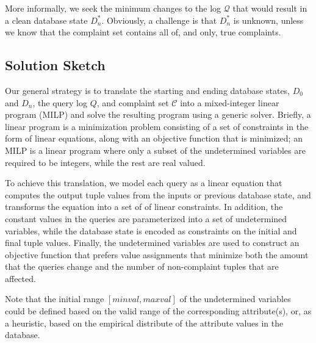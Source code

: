 More informally, we seek the minimum changes to the log $\mathcal{Q}$
that would result in a clean database state $D_n^*$. Obviously, a
challenge is that $D_n^*$ is unknown, unless we know that the
complaint set contains all of, and only, true complaints. 


\subsection{Solution Sketch}

Our general strategy is to translate the starting
and ending database states, $D_0$ and $D_n$, the query log $Q$, and
complaint set $\mathcal{C}$ into a mixed-integer linear program (MILP)
and solve the resulting program using a generic solver.  
Briefly, a linear program is a minimization problem consisting of
a set of constraints in the form of linear equations, along with
an objective function that is minimized; an MILP is a linear program
where only a subset of the undetermined variables are required to
be integers, while the rest are real valued.  

\iffalse
For example, in the following
example, $b$ and $z$ are undetermined integer and real valued variables, respectively,
whereas $x$ is determined to be $1$.  The objective function is $b+z$, 
resulting in the optimal solution $b = z = 1$.

\[
\begin{array}{l l l}
minimize      & b + z\\
\mbox{s.t.}   &x &= b * z \\
              &x &= 1\\
              &b &\in \{0, 1, 2, 3\}\\
              &z &\le 6\\
              &z &\ge 0\\
\end{array}
\]
\fi

To achieve this translation,
we model each query as a linear equation that computes the output
tuple values from the inputs or previous database state,
and transforms the equation into a
set of of linear constraints. In addition, the constant values in
the queries are parameterized into a set of undetermined variables,
while the database state is encoded as constraints on the initial
and final tuple values. Finally, the undetermined variables are
used to construct an objective function that prefers value assignments
that minimize both the amount that the queries change and the number
of non-complaint tuples that are affected.

Note that the initial range $[minval, maxval]$ of the 
undetermined variables could be defined based on
the valid range of the corresponding attribute(s), or, as a heuristic,
based on the empirical distribute of the attribute values in the database. 

